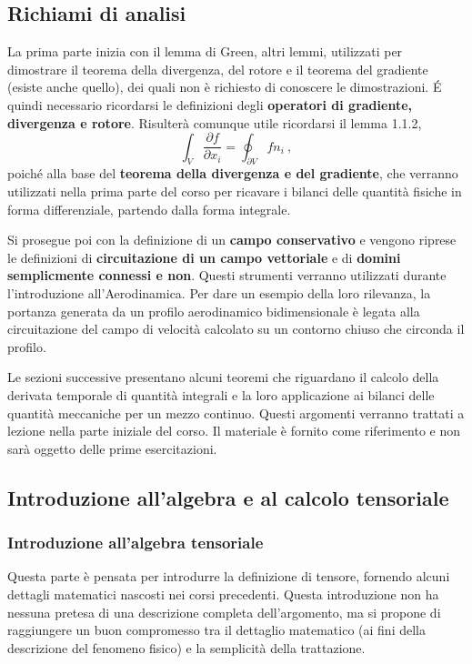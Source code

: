 \documentclass[11pt,fleqn]{article}
\begin{document}
\subsection*{Richiami di analisi}
La prima parte inizia con il lemma di Green, altri lemmi, utilizzati per dimostrare il teorema della divergenza, del rotore e il teorema del gradiente (esiste anche quello), dei quali non è richiesto di conoscere le dimostrazioni. \'E quindi necessario ricordarsi le definizioni degli \textbf{operatori di gradiente, divergenza e rotore}. Risulterà comunque utile ricordarsi il lemma 1.1.2,
\begin{equation}
  \int_V \dfrac{\partial f}{\partial x_i} = \oint_{\partial V} f n_i \ ,
\end{equation}
poiché alla base del \textbf{teorema della divergenza e del gradiente}, che verranno utilizzati nella prima parte del corso per ricavare i bilanci delle quantità fisiche in forma differenziale, partendo dalla forma integrale.

Si prosegue poi con la definizione di un \textbf{campo conservativo} e vengono riprese le definizioni di \textbf{circuitazione di un campo vettoriale} e di \textbf{domini semplicmente connessi e non}. Questi strumenti verranno utilizzati durante l'introduzione all'Aerodinamica. Per dare un esempio della loro rilevanza, la portanza generata da un profilo aerodinamico bidimensionale è legata alla circuitazione del campo di velocità calcolato su un contorno chiuso che circonda il profilo.

Le sezioni successive presentano alcuni teoremi che riguardano il calcolo della derivata temporale di quantità integrali e la loro applicazione ai bilanci delle quantità meccaniche per un mezzo continuo. Questi argomenti verranno trattati a lezione nella parte iniziale del corso. Il materiale è fornito come riferimento e non sarà oggetto delle prime esercitazioni.

\subsection*{Introduzione all'algebra e al calcolo tensoriale}
\subsubsection*{Introduzione all'algebra tensoriale}
Questa parte è pensata per introdurre la definizione di tensore, fornendo alcuni dettagli matematici nascosti nei corsi precedenti. Questa introduzione non ha nessuna pretesa di una descrizione completa dell'argomento, ma si propone di raggiungere un buon compromesso tra il dettaglio matematico (ai fini della descrizione del fenomeno fisico) e la semplicità della trattazione.
\end{document}
